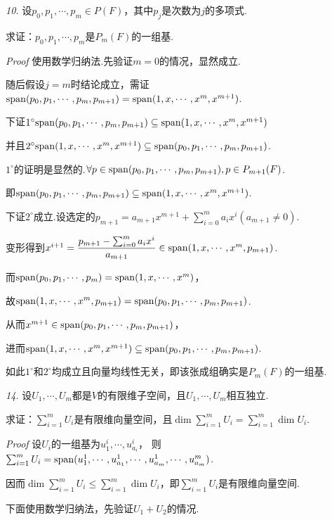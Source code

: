 \textit{10.}
设\(p_0,p_1,\cdots,p_m\in P(F)\)，其中\(p_j\)是次数为\(j\)的多项式.

求证：\(p_0,p_1,\cdots,p_m\)是\(P_m(F)\)的一组基.

\textit{Proof}
使用数学归纳法.先验证\(m=0\)的情况，显然成立.

随后假设\(j=m\)时结论成立，需证\(\mathrm{span} (p_0,p_1,\cdots,p_m,p_{m+1})=\mathrm{span} (1,x,\cdots,x^m,x^{m+1})\).

下证\(1^{\circ}\mathrm{span} (p_0,p_1,\cdots,p_m,p_{m+1}) \subseteq \mathrm{span} (1,x,\cdots,x^m,x^{m+1})\)

并且\(2^{\circ}\mathrm{span} (1,x,\cdots,x^m,x^{m+1}) \subseteq \mathrm{span} (p_0,p_1,\cdots,p_m,p_{m+1})\).

\(1^{\circ}\)的证明是显然的.\(\forall p\in \mathrm{span} (p_0,p_1,\cdots,p_m,p_{m+1}),p\in P_{m+1}(F)\).

即\(\mathrm{span} (p_0,p_1,\cdots,p_m,p_{m+1})\subseteq \mathrm{span} (1,x,\cdots,x^m,x^{m+1})\).

下证\(2^{\circ}\)成立.设选定的\(p_{m+1}=a_{m+1}x^{m+1}+\sum_{i=0}^m a_ix^i(a_{m+1} \ne 0)\).

变形得到\(x^{i+1}=\dfrac{p_{m+1}-\sum_{i=0}^m a_ix^i}{a_{m+1}} \in \mathrm{span} (1,x,\cdots,x^m,p_{m+1})\).

而\(\mathrm{span} (p_0,p_1,\cdots,p_m)=\mathrm{span} (1,x,\cdots,x^m)\)，

故\(\mathrm{span} (1,x,\cdots,x^m,p_{m+1})=\mathrm{span} (p_0,p_1,\cdots,p_m,p_{m+1})\).

从而\(x^{m+1}\in \mathrm{span} (p_0,p_1,\cdots,p_m,p_{m+1})\)，

进而\(\mathrm{span} (1,x,\cdots,x^m,x^{m+1}) \subseteq \mathrm{span} (p_0,p_1,\cdots,p_m,p_{m+1})\).

如此\(1^{\circ}\)和\(2^{\circ}\)均成立且向量均线性无关，即该张成组确实是\(P_m(F)\)的一组基.

\hspace*{\fill}

\textit{14.}
设\(U_1,\cdots,U_m\)都是\(V\)的有限维子空间，且\(U_1,\cdots,U_m\)相互独立.

求证：\(\sum_{i=1}^m U_i\)是有限维向量空间，且\(\dim \sum_{i=1}^m U_i=\sum_{i=1}^m \dim U_i\).

\textit{Proof}
设\(U_i\)的一组基为\(u_1^i,\cdots,u_{a_i}^i\)，
则\(\sum_{i=1}^m U_i=\mathrm{span}(u_1^1,\cdots,u_{a_1}^1,\cdots,u_{a_m}^1,\cdots,u_{a_m}^m)\).

因而\(\dim \sum_{i=1}^m U_i \leq \sum_{i=1}^m \dim U_i\)，即\(\sum_{i=1}^m U_i\)是有限维向量空间.

下面使用数学归纳法，先验证\(U_1+U_2\)的情况.

